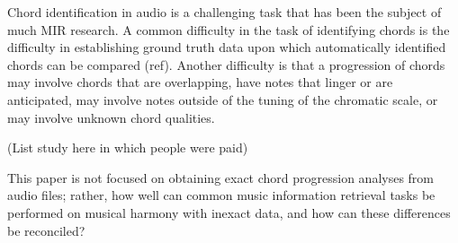 Chord identification in audio is a challenging task that has been the subject of much MIR research. A common difficulty in the task of identifying chords is the difficulty in establishing ground truth data upon which automatically identified chords can be compared (ref). Another difficulty is that a progression of chords may involve chords that are overlapping, have notes that linger or are anticipated, may involve notes outside of the tuning of the chromatic scale, or may involve unknown chord qualities.

(List study here in which people were paid)

This paper is not focused on obtaining exact chord progression analyses from audio files; rather, how well can common music information retrieval tasks be performed on musical harmony with inexact data, and how can these differences be reconciled?